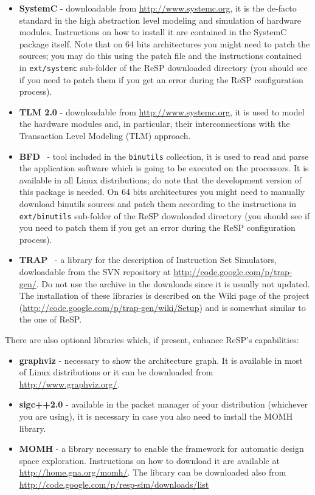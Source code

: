 \begin{itemize}
  \item \textbf{SystemC} - downloadable from \url{http://www.systemc.org}, it is the de-facto standard in the high abstraction level modeling and simulation of hardware modules. Instructions on how to install it are contained in the SystemC package itself. Note that on 64 bits architectures you might need to patch the sources; you may do this using the patch file and the instructions contained in \texttt{ext/systemc} sub-folder of the ReSP downloaded directory (you should see if you need to patch them if you get an error during the ReSP configuration process).
  \item \textbf{TLM 2.0} - downloadable from \url{http://www.systemc.org}, it is used to model the hardware modules and, in particular, their interconnections with the Transaction Level Modeling (TLM) approach.
  \item \textbf{BFD}~\cite{binary_binutils} - tool included in the \texttt{binutils} collection, it is used to read and parse the application software which is going to be executed on the processors. It is available in all Linux distributions; do note that the development version of this package is needed. On 64 bits architectures you might need to manually download binutils sources and patch them according to the instructions in \texttt{ext/binutils} sub-folder of the ReSP downloaded directory (you should see if you need to patch them if you get an error during the ReSP configuration process).
  \item \textbf{TRAP}~\cite{fossati_trap} - a library for the description of Instruction Set Simulators, dowloadable from the SVN repository at \url{http://code.google.com/p/trap-gen/}. Do not use the archive in the downloads since it is usually not updated. The installation of these libraries is described on the Wiki page of the project (\url{http://code.google.com/p/trap-gen/wiki/Setup}) and is somewhat similar to the one of ReSP.
\end{itemize}
\indent There are also optional libraries which, if present, enhance ReSP's capabilities:
\begin{itemize}
  \item \textbf{graphviz} - necessary to show the architecture graph. It is available in most of Linux distributions or it can be downloaded from \url{http://www.graphviz.org/}.
  \item \textbf{sigc++2.0} - available in the packet manager of your distribution (whichever you are using), it is necessary in case you also need to install the MOMH library.
  \item \textbf{MOMH} - a library necessary to enable the framework for automatic design space exploration. Instructions on how to download it are available at \url{http://home.gna.org/momh/}. The library can be downloaded also from \url{http://code.google.com/p/resp-sim/downloads/list}
\end{itemize}

